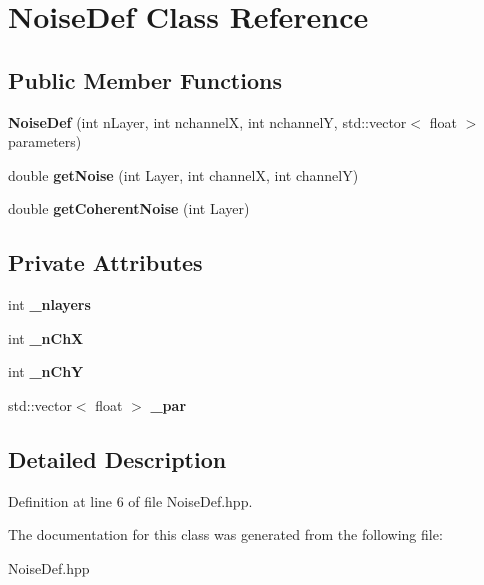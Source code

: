 \section{Noise\-Def Class Reference}
\label{classNoiseDef}
\subsection*{Public Member Functions}
\begin{DoxyCompactItemize}
\item 
{\bfseries Noise\-Def} (int n\-Layer, int nchannel\-X, int nchannel\-Y, std\-::vector$<$ float $>$ parameters)\label{classNoiseDef_a6b71486b7818ffdb3890915cb66e0d2e}

\item 
double {\bfseries get\-Noise} (int Layer, int channel\-X, int channel\-Y)\label{classNoiseDef_aea7dd7d26032b0037444dbe2723da59d}

\item 
double {\bfseries get\-Coherent\-Noise} (int Layer)\label{classNoiseDef_a4c2ff83a0b89a33eba1e2143b7ff9e23}

\end{DoxyCompactItemize}
\subsection*{Private Attributes}
\begin{DoxyCompactItemize}
\item 
int {\bfseries \-\_\-nlayers}\label{classNoiseDef_abd21b35506c9469adff7a2c9fe529801}

\item 
int {\bfseries \-\_\-n\-Ch\-X}\label{classNoiseDef_ac6ee3572127a83effa38dc0411895660}

\item 
int {\bfseries \-\_\-n\-Ch\-Y}\label{classNoiseDef_a9383212801004f30f5497bc16e7a6c13}

\item 
std\-::vector$<$ float $>$ {\bfseries \-\_\-par}\label{classNoiseDef_aa0f63b7ad971e2217a2a157057bcae3b}

\end{DoxyCompactItemize}


\subsection{Detailed Description}


Definition at line 6 of file Noise\-Def.\-hpp.



The documentation for this class was generated from the following file\-:\begin{DoxyCompactItemize}
\item 
Noise\-Def.\-hpp\end{DoxyCompactItemize}

